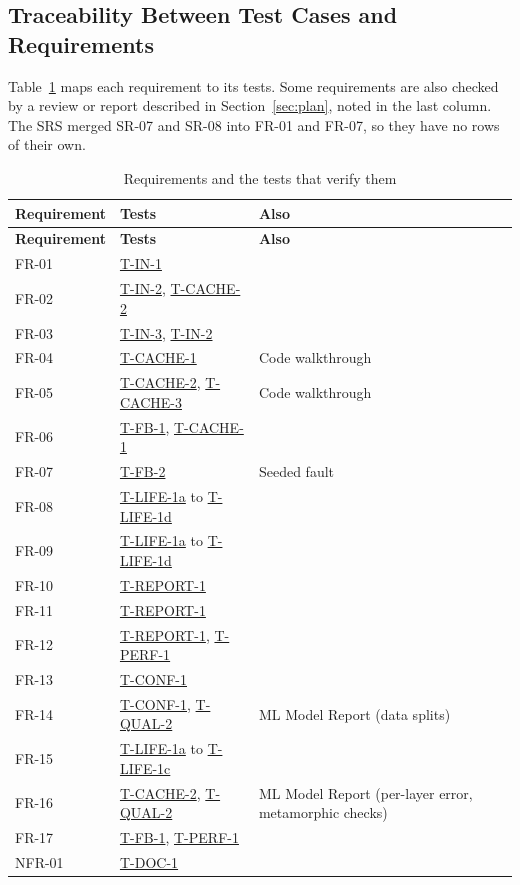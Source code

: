 \documentclass[12pt, titlepage]{article}
\newcommand{\tref}[1]{\hyperref[test:#1]{#1}}
\begin{document}
\subsection{Traceability Between Test Cases and Requirements}

Table~\ref{tab:trace} maps each requirement to its tests. Some requirements
are also checked by a review or report described in Section~\ref{sec:plan}, noted in
the last column. The SRS merged SR-07 and SR-08 into FR-01 and FR-07, so
they have no rows of their own.

\begin{longtable}{@{}p{}p{}p{}@{}}
\caption{Requirements and the tests that verify them}\label{tab:trace}\\
\toprule \textbf{Requirement} & \textbf{Tests} & \textbf{Also}\\\midrule
\endfirsthead
\toprule \textbf{Requirement} & \textbf{Tests} & \textbf{Also}\\\midrule
\endhead
FR-01 & \tref{T-IN-1} & \\
FR-02 & \tref{T-IN-2}, \tref{T-CACHE-2} & \\
FR-03 & \tref{T-IN-3}, \tref{T-IN-2} & \\
FR-04 & \tref{T-CACHE-1} & Code walkthrough\\
FR-05 & \tref{T-CACHE-2}, \tref{T-CACHE-3} & Code walkthrough\\
FR-06 & \tref{T-FB-1}, \tref{T-CACHE-1} & \\
FR-07 & \tref{T-FB-2} & Seeded fault\\
FR-08 & \tref{T-LIFE-1a} to \tref{T-LIFE-1d} & \\
FR-09 & \tref{T-LIFE-1a} to \tref{T-LIFE-1d} & \\
FR-10 & \tref{T-REPORT-1} & \\
FR-11 & \tref{T-REPORT-1} & \\
FR-12 & \tref{T-REPORT-1}, \tref{T-PERF-1} & \\
FR-13 & \tref{T-CONF-1} & \\
FR-14 & \tref{T-CONF-1}, \tref{T-QUAL-2} & ML Model Report (data
splits)\\
FR-15 & \tref{T-LIFE-1a} to \tref{T-LIFE-1c} & \\
FR-16 & \tref{T-CACHE-2}, \tref{T-QUAL-2} & ML Model Report (per-layer
error, metamorphic checks)\\
FR-17 & \tref{T-FB-1}, \tref{T-PERF-1} & \\
NFR-01 & \tref{T-DOC-1} & \\

\end{longtable}
\end{document}
